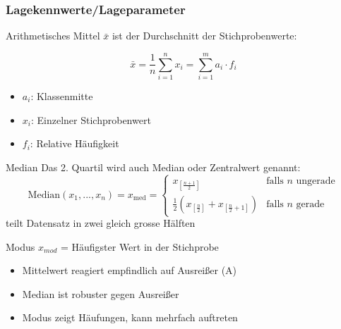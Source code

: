 \raggedcolumns

\subsubsection{Lagekennwerte/Lageparameter}

\begin{concept}{Arithmetisches Mittel} $\bar{x}$ ist der Durchschnitt der Stichprobenwerte:

    \begin{minipage}{0.45\columnwidth}
        $$\bar{x} = \frac{1}{n}\sum_{i=1}^n x_i = \sum_{i=1}^m a_i \cdot f_i$$
    \end{minipage}
    \hspace{2mm}
    \begin{minipage}{0.5\columnwidth}
        \vspace{1mm}
        \begin{itemize}
            \item $a_i$: Klassenmitte
            \item $x_i$: Einzelner Stichprobenwert
            \item $f_i$: Relative Häufigkeit
        \end{itemize}
    \end{minipage}
\end{concept}

\begin{concept}{Median} Das 2. Quartil wird auch Median oder Zentralwert genannt:
    $$\text{Median}(x_1,...,x_n) = x_{\text{med}} = \begin{cases}
    x_{[\frac{n+1}{2}]} & \text{falls } n \text{ ungerade}\\
    \frac{1}{2}(x_{[\frac{n}{2}]} + x_{[\frac{n}{2}+1]}) & \text{falls } n \text{ gerade}
    \end{cases}$$
    teilt Datensatz in zwei gleich grosse Hälften
\end{concept}

\begin{concept}{Modus}
    $x_{mod}$ = Häufigster Wert in der Stichprobe
\end{concept}

\begin{remark}
\begin{itemize}
    \item Mittelwert reagiert empfindlich auf Ausreißer (A)
    \item Median ist robuster gegen Ausreißer
    \item Modus zeigt Häufungen, kann mehrfach auftreten
\end{itemize}
\end{remark}



